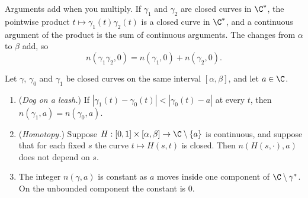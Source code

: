 Arguments add when you multiply. If $\gamma_1$ and $\gamma_2$ are closed curves in $\C^*$, the pointwise product $t\mapsto\gamma_1(t)\gamma_2(t)$ is a closed curve in $\C^*$, and a continuous argument of the product is the sum of continuous arguments. The changes from $\alpha$ to $\beta$ add, so
\[
n(\gamma_1\gamma_2,0)=n(\gamma_1,0)+n(\gamma_2,0).
\]

\begin{proposition}\label{prop:windingprops}
Let $\gamma$, $\gamma_0$ and $\gamma_1$ be closed curves on the same interval $[\alpha,\beta]$, and let $a\in\C$.
\begin{enumerate}
\item[(a)] (\emph{Dog on a leash.}) If $|\gamma_1(t)-\gamma_0(t)|<|\gamma_0(t)-a|$ at every $t$, then $n(\gamma_1,a)=n(\gamma_0,a)$.
\item[(b)] (\emph{Homotopy.}) Suppose $H:[0,1]\times[\alpha,\beta]\to\C\setminus\{a\}$ is continuous, and suppose that for each fixed $s$ the curve $t\mapsto H(s,t)$ is closed. Then $n(H(s,\cdot),a)$ does not depend on $s$.
\item[(c)] The integer $n(\gamma,a)$ is constant as $a$ moves inside one component of $\C\setminus\gamma^*$. On the unbounded component the constant is $0$.
\end{enumerate}
\end{proposition}

